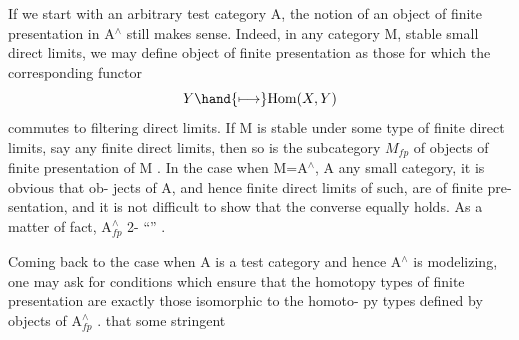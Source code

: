 If we start with an arbitrary test category A,  the notion of an
object of finite presentation in A$^\wedge$ still makes sense.  Indeed,  in any
category M,  stable   small direct limits,  we may define object of
finite presentation as those for which the corresponding \hand{\uline{\textcolor{black}{covariant}}}
functor
\[ Y \hand{\longmapsto} \mathrm{Hom}(X,Y) \]
commutes to filtering  direct limits.  If M is stable under 
some type of finite direct limits,  say  any finite direct limits,  then
so is the  subcategory $M_{fp}$  of objects of finite presentation of M .
In the case when M=A$^\wedge$,  A any small category,  it is obvious that ob-%
jects of A,  and hence finite direct limits of such,  are of finite pre-%
sentation,  and it is not difficult to show that the converse equally
holds.  As a matter of fact,  A$^\wedge_{fp}$  \hand{\uline{\textcolor{black}{can be viewed as the solution of the}}}
2-\hand{\uline{\textcolor{black}{universal}}} \hand{\uline{\textcolor{black}{problem of}}} ``\hand{\uline{\textcolor{black}{adding finite direct limits to A}}}'' .

Coming back to the case when A is a test category\hand{,} and hence A$^\wedge$ is
modelizing,  one may ask for conditions  which ensure that the homotopy
types of finite presentation are exactly those isomorphic to the homoto-%
py types defined by objects of A$^\wedge_{fp}$ .     that some stringent

